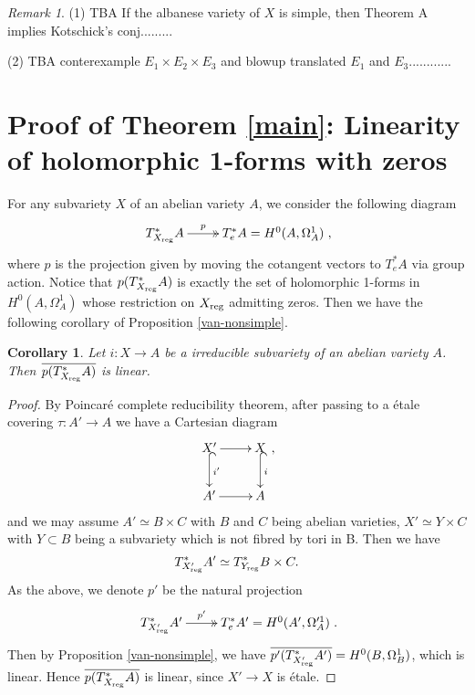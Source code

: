 \documentclass[a4paper,12pt,reqno]{amsart}
\theoremstyle{plain}
\newtheorem{corollary}[theorem]{Corollary}
\theoremstyle{definition}
\theoremstyle{remark}
\newtheorem{remark}[theorem]{Remark}
\renewcommand{\cong}{\simeq}
\begin{document}
\begin{remark}
(1) {\color{red}TBA If the albanese variety of $X$ is simple, then Theorem A implies Kotschick's conj.........}

(2) {\color{red} TBA conterexample $E_1\times E_2\times E_3$ and blowup translated $E_1$ and $E_3$............}
\end{remark}





\section{Proof of Theorem {\ref{main}}: Linearity of holomorphic 1-forms with zeros} 
For any subvariety $X$ of an abelian variety $A$, we consider the following diagram 
$$\xymatrix{
T^*_{X_{\textnormal{reg}}}A\ar@{->>}[r]^-p& T^*_e A=H^0(A, \Omega_A^1)
},$$ where $p$ is the projection given by moving the cotangent vectors to $T^*_eA$ via group action. Notice that $p(T^*_{X_{\textnormal{reg}}}A)$ is exactly the set of holomorphic 1-forms in $H^0(A, \Omega_A^1)$ whose restriction on $X_{\textnormal{reg}}$ admitting zeros. Then we have the following corollary of Proposition \ref{van-nonsimple}.

\begin{corollary}\label{Main-coro}
Let $i: X\to A$ be a irreducible subvariety of an abelian variety $A$. Then $\overline{p(T^*_{X_{\textnormal{reg}}}A)}$ is linear. 
\end{corollary}


\begin{proof}
By Poincar\'e complete reducibility theorem, after passing to a \'etale covering $\tau:A'\to A$ we have a Cartesian diagram 
$$\xymatrix{
X'\ar[r]\ar@{^{(}->}[d]^-{i'}& X\ar@{^{(}->}[d]^-{i}\\
A'\ar[r]& A},$$ and we may assume $A'\cong B\times C$ with $B$ and $C$ being abelian varieties, $X'\cong Y\times C$ with $Y\subset B$ being a subvariety which is not fibred by tori in B. Then we have $$T^*_{X'_{\textnormal{reg}}}A'\cong T^*_{Y_{\textnormal{reg}}}B\times C.$$ As the above, we denote $p'$ be the natural projection $$\xymatrix{
T^*_{X'_{\textnormal{reg}}}A'\ar@{->>}[r]^-{p'}& T^*_e A'=H^0(A', \Omega_A'^1)
}.$$  Then by Proposition \ref{van-nonsimple}, we have $\overline{p'(T^*_{X'_{\textnormal{reg}}}A')}=H^0(B, \Omega_B^1)$, which is linear. Hence $\overline{p(T^*_{X_{\textnormal{reg}}}A)}$ is linear, since $X'\to X$ is \'etale.
\end{proof}
\end{document}
